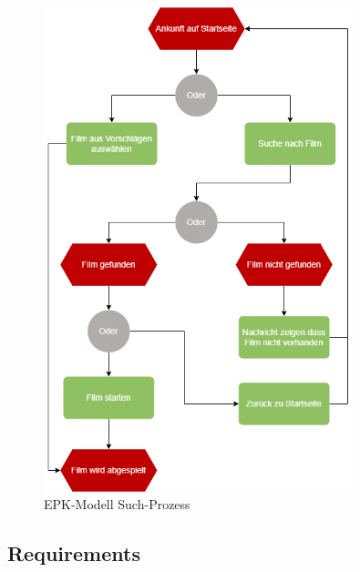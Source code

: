 \begin{appendix}
    \begin{figure}[ht]
        \centering
        \includegraphics[width=0.8\textwidth]{images/ReQ_MovieSearch_EPK}
        \caption{EPK-Modell Such-Prozess}
        \label{fig:epk_search}
    \end{figure}

    \subsection{Requirements}\label{subsec:requirements}
    

\end{appendix}